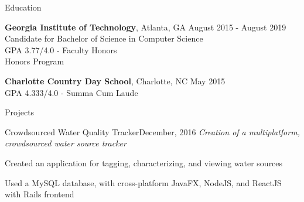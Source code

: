 \documentclass{resume} %
\begin{document}
\begin{rSection}{Education}

  \textbf{Georgia Institute of Technology}, Atlanta, GA \hfill {August 2015 - August 2019}
  \\ Candidate for Bachelor of Science in Computer Science
  \\ GPA 3.77/4.0 - Faculty Honors
  \\ Honors Program

  \textbf{Charlotte Country Day School}, Charlotte, NC \hfill {May 2015}
  \\ GPA 4.333/4.0 - Summa Cum Laude

\end{rSection}


\begin{rSection}{Projects}

  \begin{rSubsection}{Crowdsourced Water Quality Tracker}{December, 2016}{}{}
  \textit{Creation of a multiplatform, crowdsourced water source tracker}
  \item Created an application for tagging, characterizing, and viewing water sources
  \item Used a MySQL database, with cross-platform JavaFX, NodeJS, and ReactJS
    with Rails frontend
  \end{rSubsection}

\end{rSection}


\end{document}
